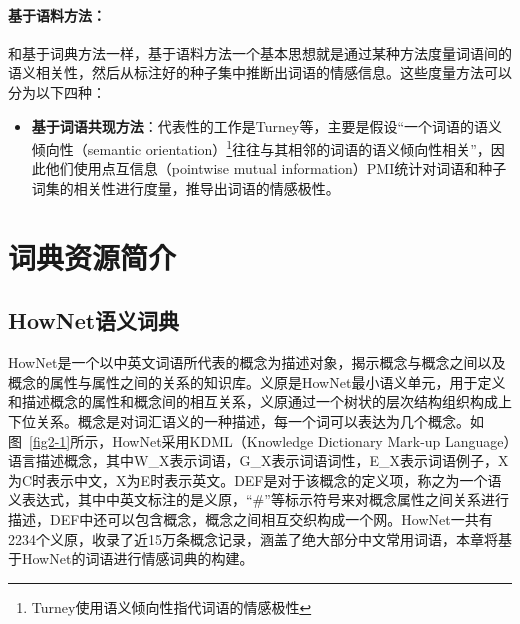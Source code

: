 \paragraph{基于语料方法：}
和基于词典方法一样，基于语料方法一个基本思想就是通过某种方法度量词语间的语义相关性，然后从标注好的种子集中推断出词语的情感信息。这些度量方法可以分为以下四种：
\begin{itemize}
\item \textbf{基于词语共现方法}：代表性的工作是Turney等，主要是假设“一个词语的语义倾向性（semantic orientation）\footnote{Turney使用语义倾向性指代词语的情感极性}往往与其相邻的词语的语义倾向性相关”，因此他们使用点互信息（pointwise mutual information）PMI统计对词语和种子词集的相关性进行度量，推导出词语的情感极性。
\end{itemize}



\section{词典资源简介}
\label{ch2:lex}

\subsection{HowNet语义词典}
HowNet是一个以中英文词语所代表的概念为描述对象，揭示概念与概念之间以及概念的属性与属性之间的关系的知识库。义原是HowNet最小语义单元，用于定义和描述概念的属性和概念间的相互关系，义原通过一个树状的层次结构组织构成上下位关系。概念是对词汇语义的一种描述，每一个词可以表达为几个概念。如图~\ref{fig2-1}所示，HowNet采用KDML（Knowledge Dictionary Mark-up Language）语言描述概念，其中W\_X表示词语，G\_X表示词语词性，E\_X表示词语例子，X为C时表示中文，X为E时表示英文。DEF是对于该概念的定义项，称之为一个语义表达式，其中中英文标注的是义原，“\#\*”等标示符号来对概念属性之间关系进行描述，DEF中还可以包含概念，概念之间相互交织构成一个网。HowNet一共有2234个义原，收录了近15万条概念记录，涵盖了绝大部分中文常用词语，本章将基于HowNet的词语进行情感词典的构建。

